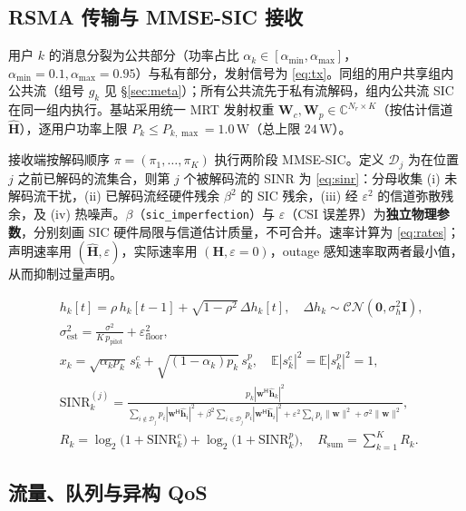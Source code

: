 \documentclass[UTF8,11pt,a4paper]{ctexart}
\theoremstyle{plain}
\theoremstyle{definition}
\theoremstyle{remark}
\newcommand{\C}{\mathbb{C}}
\newcommand{\E}{\mathbb{E}}
\newcommand{\vect}[1]{\mathbf{#1}}
\newcommand{\abs}[1]{\left|#1\right|}
\begin{document}
\subsection{RSMA 传输与 MMSE-SIC 接收}

用户 $k$ 的消息分裂为公共部分（功率占比 $\alpha_k\in[\alpha_{\min},\alpha_{\max}]$，$\alpha_{\min}=0.1,\alpha_{\max}=0.95$）与私有部分，发射信号为 \eqref{eq:tx}。同组的用户共享组内公共流（组号 $g_k$ 见 \S\ref{sec:meta}）；所有公共流先于私有流解码，组内公共流 SIC 在同一组内执行。基站采用统一 MRT 发射权重 $\vect W_c,\vect W_p\in\C^{N_r\times K}$（按估计信道 $\hat{\vect{H}}$），逐用户功率上限 $P_k\le P_{k,\max}=1.0\,\mathrm{W}$（总上限 $24\,\mathrm{W}$）。

接收端按解码顺序 $\pi=(\pi_1,\dots,\pi_K)$ 执行两阶段 MMSE-SIC。定义 $\mathcal D_j$ 为在位置 $j$ 之前已解码的流集合，则第 $j$ 个被解码流的 SINR 为 \eqref{eq:sinr}：分母收集 (i) 未解码流干扰，(ii) 已解码流经硬件残余 $\beta^2$ 的 SIC 残余，(iii) 经 $\varepsilon^2$ 的信道弥散残余，及 (iv) 热噪声。$\beta$（\texttt{sic\_imperfection}）与 $\varepsilon$（CSI 误差界）为\textbf{独立物理参数}，分别刻画 SIC 硬件局限与信道估计质量，不可合并。速率计算为 \eqref{eq:rates}；声明速率用 $(\hat{\vect{H}},\varepsilon)$，实际速率用 $(\vect H,\varepsilon{=}0)$，outage 感知速率取两者最小值，从而抑制过量声明。

\begin{align}
  &h_k[t] = \rho\, h_k[t-1] + \sqrt{1-\rho^2}\,\Delta h_k[t],\quad \Delta h_k\sim\mathcal{CN}(\vect 0,\sigma_h^2\vect I), \label{eq:ar1}\\
  &\sigma_{\mathrm{est}}^2 = \frac{\sigma^2}{K\,p_{\mathrm{pilot}}} + \varepsilon_{\mathrm{floor}}^2, \label{eq:csi}\\
  &x_k = \sqrt{\alpha_k p_k}\, s_k^c + \sqrt{(1-\alpha_k) p_k}\, s_k^p,\quad \E\abs{s_k^c}^2=\E\abs{s_k^p}^2=1, \label{eq:tx}\\
  &\mathrm{SINR}_k^{(j)} = \frac{p_k\abs{\vect w^{\mathsf H}\hat{\vect h}_k}^2}
    {\sum_{i\notin\mathcal D_j}p_i\abs{\vect w^{\mathsf H}\hat{\vect h}_i}^2
     + \beta^2\sum_{i\in\mathcal D_j}p_i\abs{\vect w^{\mathsf H}\hat{\vect h}_i}^2
     + \varepsilon^2\sum_i p_i\|\vect w\|^2 + \sigma^2\|\vect w\|^2}, \label{eq:sinr}\\
  &R_k = \log_2\!\big(1+\mathrm{SINR}_k^c\big)+\log_2\!\big(1+\mathrm{SINR}_k^p\big),\quad R_{\mathrm{sum}}=\sum_{k=1}^{K}R_k. \label{eq:rates}
\end{align}

\subsection{流量、队列与异构 QoS}
\end{document}
